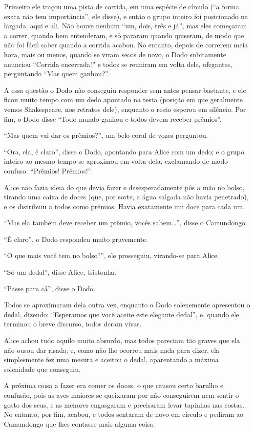 Primeiro ele traçou uma pista de corrida, em uma espécie de círculo (``a
forma exata não tem importância'', ele disse), e então o grupo inteiro
foi posicionado na largada, aqui e ali. Não houve nenhum ``um, dois,
três e já'', mas eles começaram a correr, quando bem entenderam, e só
pararam quando quiseram, de modo que não foi fácil saber quando a
corrida acabou. No entanto, depois de correrem meia hora, mais ou menos,
quando se viram secos de novo, o Dodo subitamente anunciou ``Corrida
encerrada!'' e todos se reuniram em volta dele, ofegantes, perguntando
``Mas quem ganhou?''.

A essa questão o Dodo não conseguiu responder sem antes pensar bastante, e
ele ficou muito tempo com um dedo apontado na testa (posição em que
geralmente vemos Shakespeare, nos retratos dele), enquanto o resto
esperou em silêncio. Por fim, o Dodo disse ``Todo mundo ganhou e todos
devem receber prêmios''.

``Mas quem vai dar os prêmios?'', um belo coral de vozes perguntou.

``Ora, ela, é claro'', disse o Dodo, apontando para Alice com um dedo; e
o grupo inteiro ao mesmo tempo se aproximou em volta dela, exclamando de
modo confuso: ``Prêmios! Prêmios!''.

Alice não fazia ideia do que devia fazer e desesperadamente pôs a mão
no bolso, tirando uma caixa de doces (que, por sorte, a água salgada não
havia penetrado), e os distribuiu a todos como prêmios. Havia exatamente
um doce para cada um.

``Mas ela também deve receber um prêmio, vocês sabem\ldots{}'', disse o
Camundongo.

``É claro'', o Dodo respondeu muito gravemente.

``O que mais você tem no bolso?'', ele prosseguiu, virando-se para Alice.

``Só um dedal'', disse Alice, tristonha.

``Passe para cá'', disse o Dodo.

Todos se aproximaram dela outra vez, enquanto o Dodo solenemente
apresentou o dedal, dizendo: ``Esperamos que você aceite este elegante
dedal'', e, quando ele terminou o breve discurso, todos deram vivas.

Alice achou tudo aquilo muito absurdo, mas todos pareciam tão graves que
ela não ousou dar risada; e, como não lhe ocorreu mais nada para dizer,
ela simplesmente fez uma mesura e aceitou o dedal, aparentando a máxima
solenidade que conseguiu.

A próxima coisa a fazer era comer os doces, o que causou certo barulho e
confusão, pois as aves maiores se queixaram por não conseguirem nem
sentir o gosto dos seus, e as menores engasgaram e precisaram levar
tapinhas nas costas. No entanto, por fim, acabou, e todos sentaram de
novo em círculo e pediram ao Camundongo que lhes contasse mais alguma
coisa.

